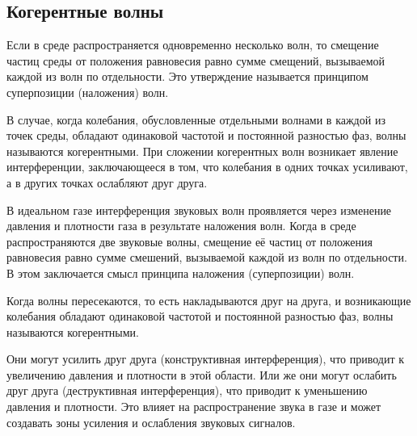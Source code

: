 \documentclass[referat,times]{SCWorks}
\begin{document}
\subsection{Когерентные волны}
\par Если в среде распространяется одновременно несколько волн, то смещение частиц среды от положения равновесия равно сумме смещений, вызываемой каждой из волн по отдельности. Это утверждение называется принципом суперпозиции (наложения) волн.
\par В случае, когда колебания, обусловленные отдельными волнами в каждой из точек среды, обладают одинаковой частотой и постоянной разностью фаз, волны называются когерентными. При сложении когерентных волн возникает явление интерференции, заключающееся в том, что колебания в одних точках усиливают, а в других точках ослабляют друг друга. 
\par В идеальном газе интерференция звуковых волн проявляется через изменение давления и плотности газа в результате наложения волн. Когда в среде распространяются две звуковые волны, смещение её частиц от положения равновесия равно сумме смешений, вызываемой каждой из волн по отдельности. В этом заключается смысл принципа наложения (суперпозиции) волн.
\par Когда волны пересекаются, то есть накладываются друг на друга, и возникающие колебания обладают одинаковой частотой и постоянной разностью фаз, волны называются когерентными.
\par Они могут усилить друг друга (конструктивная интерференция), что приводит к увеличению давления и плотности в этой области. Или же они могут ослабить друг друга (деструктивная интерференция), что приводит к уменьшению давления и плотности. Это влияет на распространение звука в газе и может создавать зоны усиления и ослабления звуковых сигналов.
\end{document}
